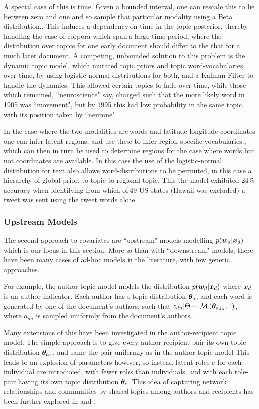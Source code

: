 A special case of this is time. Given a bounded interval, one can rescale this to lie between zero and one and so sample that particular modality using a Beta distribution.\cite{Wang2006}. This induces a dependency on time in the topic posterior, thereby handling the case of corpora which span a large time-period, where the distribution over topics for one early document should differ to the that for a much later document. A competing, unbounded solution to this problem is the dynamic topic model\cite{Blei2006a}, which mutated topic priors and topic word-vocabularies over time, by using logistic-normal distributions for both, and a Kalman Filter to handle the dynamics. This allowed certain topics to fade over time, while those which remained, ``neuroscience" say, changed such that the more likely word in 1905 was ``movement", but by 1995 this had low probability in the same topic, with its position taken by ``neurone"

In the case where the two modalities are words and latitude-longitude coordinates one can infer latent regions, and use these to infer region-specific vocabularies\cite{Eisenstein2010}., which can then in turn be used to determine regions for the case where words but not coordinates are available. In this case the use of the logistic-normal distribution for text also allows word-distributions to be permuted, in this case a hierarchy of global prior, to topic to regional topic. This the model exhibited 24\% accuracy when identifying from which of 49 US states (Hawaii was excluded) a tweet was sent using the tweet words alone.

\subsubsection{Upstream Models}
The second approach to covariates are ``upstream" models modelling $p({ \bm w_d } | { \bm x_d })$ which is our focus in this section. More so than with ``downstream" models, there have been many cases of ad-hoc models in the literature, with few generic approaches.

For example, the author-topic model\cite{RosenZvi2004} models the distribution $p({ \bm w_d } | { \bm x_d })$ where ${ \bm x_d }$ is an author indicator. Each author has a topic-distribution $\bm \theta_a$, and each word is generated by one of the document's authors, such that $z_{dn} | \Theta \sim \mathcal{M} \left( {\bm \theta_{a_{dn}}},{1} \right)$, where $a_{dn}$ is sampled uniformly from the document's authors.

Many extensions of this have been investigated in the author-recipient topic model\cite{MacCallum2007}. The simple approach is to give every author-recipient pair its own topic distribution $\bm \theta_{ar}$, and same the pair uniformly as in the author-topic model This leads to an explosion of parameters however, so instead latent roles $e$ for each individual are introduced, with fewer roles than individuals, and with each role-pair having its own topic distribution $\bm \theta_e$. This idea of capturing network relationships and communities by shared topics among authors and recipients has been further explored in \cite{Sachan2012} and \cite{Kang2013}.

